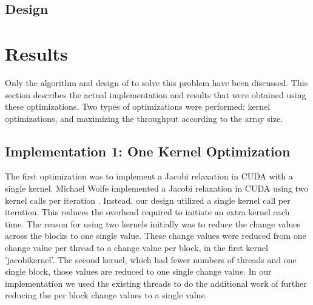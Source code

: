 \documentclass[10pt]{article}
\begin{document}
\begin{multicols}{2}
  \subsection{Design} %

  \section{Results} %
  Only the algorithm and design of to solve this problem have been discussed.
  This section describes the actual implementation and results that were obtained using these optimizations.
  Two types of optimizations were performed: kernel optimizations, and maximizing the throughput according to the array size.
  \subsection{Implementation 1: One Kernel Optimization}
  The first optimization was to implement a Jacobi relaxation in CUDA with a single kernel.
  Michael Wolfe implemented a Jacobi relaxation in CUDA using two kernel calls per iteration \cite{michael}.
  Instead, our design utilized a single kernel call per iteration.
  This reduces the overhead required to initiate an extra kernel each time.
  The reason for using two kernels initially was to reduce the change values across the blocks to one single value.
  These change values were reduced from one change value per thread to a change value per block, in the first kernel 'jacobikernel'.
  The second kernel, which had fewer numbers of threads and one single block, those values are reduced to one single change value.
  In our implementation we used the existing threads to do the additional work of further reducing the per block change values to a single value.

\end{multicols}
\end{document}
